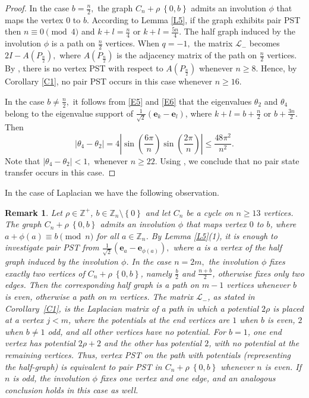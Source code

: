 \documentclass[12pt,a4paper]{article}
\newtheorem{rem}{Remark}
\def \e {{\mathbf e}}
\newcommand{\ob}[1]{\left(#1\right)}
\newcommand{\cb}[1]{\left\lbrace #1\right\rbrace}
\begin{document}
\begin{proof}
In the case $b=\frac{n}{2},$ the graph $C_n+\rho~\cb {0,b}$ admits an involution $\phi$ that maps the vertex $0$ to $b$. According to Lemma \ref{L5}, if the graph exhibits pair PST then $n \equiv 0 \pmod{4}$ and $k + l = \frac{n}{4}$  or $ k + l = \frac{5n}{4}$. The half graph induced by the involution $\phi$ is a path on $\frac{n}{2}$ vertices. When $q=-1,$ the matrix $\mathscr{L}_-$ becomes $2I-A(P_{\frac{n}{2}}),$ where $A(P_{\frac{n}{2}})$ is the adjacency matrix of the path on $\frac{n}{2}$ vertices. By \cite[Theorem 9]{cou2024}, there is no vertex PST with respect to $A(P_{\frac{n}{2}})$ whenever $n\geq 8$. Hence, by Corollary \ref{C1}, no pair PST occurs in this case whenever $n \geq 16.$

In the case $b \neq \frac{n}{2},$ it follows from \eqref{E5} and \eqref{E6} that the eigenvalues $\theta_2$ and $\theta_4$ belong to the eigenvalue support of $\frac{1}{\sqrt{2}}(\e_k-\e_l)$, where $k+l =b+\frac{n}{2}$ or $b+\frac{3n}{2}.$ Then
	$$|\theta_4-\theta_2| = 4\left|\sin\ob{\frac{6\pi}{n}} \sin\ob{\frac{2\pi}{n}} \right|
	\leq \frac{48\pi^2}{n^2}.$$
	Note that $|\theta_4-\theta_2| <1,$ whenever $n \geq 22.$ Using \cite[Corollary 3.4]{kim}, we conclude that no pair state transfer occurs in this case.
\end{proof}
In the case of Laplacian we have the following observation.
\begin{rem}
Let $\rho \in \mathbb{Z}^+$, $b \in \mathbb{Z}_n\setminus \cb{0}$ and let $C_n$ be a cycle on $n \geq 13$ vertices. The graph $C_n+\rho~\cb {0,b}$ admits an involution $\phi$ that maps vertex $0$ to $b$, where $a+\phi(a)\equiv b\pmod{n}$ for all $a\in\mathbb{Z}_n$. By Lemma \ref{L5}(1), it is enough to investigate pair PST from $\frac{1}{\sqrt{2}}(\e_a-\e_{\phi(a)}),$ where $a$ is a vertex of the half graph induced by the involution $\phi$. In the case $n=2m,$ the involution $\phi$ fixes exactly two vertices of $C_n+\rho~\cb {0,b}$, namely $\frac{b}{2}$ and $\frac{n+b}{2}$, otherwise fixes only two edges. Then the corresponding half graph is a path on $m-1$ vertices whenever $b$ is even, otherwise a path on $m$ vertices. The matrix $\mathscr{L}_-$, as stated in Corollary~\ref{C1}, is the Laplacian matrix of a path in which a potential $2\rho$ is placed at a vertex $j < m$, where the potentials at the end vertices are $1$ when $b$ is even, $2$ when $b\neq 1$ odd, and all other vertices have no potential. For $b = 1$, one end vertex has potential $2\rho+2$ and the other has potential $2$, with no potential at the remaining vertices. Thus, vertex PST on the path with potentials (representing the half-graph) is equivalent to pair PST in $C_n+\rho~\cb {0,b}$ whenever $n$ is even. If $n$ is odd, the involution $\phi$ fixes one vertex and one edge, and an analogous conclusion holds in this case as well.
\end{rem}
\end{document}

